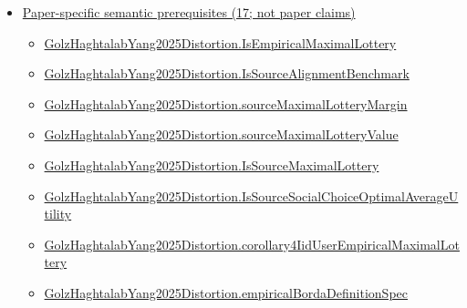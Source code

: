 \documentclass[10pt]{article}
\begin{document}
\begin{itemize}[leftmargin=1.2em]
\begin{itemize}[leftmargin=1.2em]
\item \hyperlink{library-prerequisite-268c959ee7d2d148}{Applied\allowbreak{}Modeling\allowbreak{}Lib.\allowbreak{}PMF\allowbreak{}Full\allowbreak{}Support}
\item \hyperlink{library-prerequisite-de8e2a8bfe221a38}{Applied\allowbreak{}Modeling\allowbreak{}Lib.\allowbreak{}pmf\allowbreak{}Prod}
\end{itemize}
\item \hyperlink{paper-prerequisite-section-5ef5ef0364b6939c}{Paper-specific semantic prerequisites (17; not paper claims)}
\begin{itemize}[leftmargin=1.2em]
\item \hyperlink{paper-prerequisite-53af1666fc341b0f}{Golz\allowbreak{}Haghtalab\allowbreak{}Yang2025\allowbreak{}Distortion.\allowbreak{}Is\allowbreak{}Empirical\allowbreak{}Maximal\allowbreak{}Lottery}
\item \hyperlink{paper-prerequisite-54fbc7c16362dbdd}{Golz\allowbreak{}Haghtalab\allowbreak{}Yang2025\allowbreak{}Distortion.\allowbreak{}Is\allowbreak{}Source\allowbreak{}Alignment\allowbreak{}Benchmark}
\item \hyperlink{paper-prerequisite-dbd778917da393ac}{Golz\allowbreak{}Haghtalab\allowbreak{}Yang2025\allowbreak{}Distortion.\allowbreak{}source\allowbreak{}Maximal\allowbreak{}Lottery\allowbreak{}Margin}
\item \hyperlink{paper-prerequisite-bbe7079711c4e442}{Golz\allowbreak{}Haghtalab\allowbreak{}Yang2025\allowbreak{}Distortion.\allowbreak{}source\allowbreak{}Maximal\allowbreak{}Lottery\allowbreak{}Value}
\item \hyperlink{paper-prerequisite-91b5f077c58b43c1}{Golz\allowbreak{}Haghtalab\allowbreak{}Yang2025\allowbreak{}Distortion.\allowbreak{}Is\allowbreak{}Source\allowbreak{}Maximal\allowbreak{}Lottery}
\item \hyperlink{paper-prerequisite-ceb3f23b84b56503}{Golz\allowbreak{}Haghtalab\allowbreak{}Yang2025\allowbreak{}Distortion.\allowbreak{}Is\allowbreak{}Source\allowbreak{}Social\allowbreak{}Choice\allowbreak{}Optimal\allowbreak{}Average\allowbreak{}Utility}
\item \hyperlink{paper-prerequisite-54cac251e94c8e83}{Golz\allowbreak{}Haghtalab\allowbreak{}Yang2025\allowbreak{}Distortion.\allowbreak{}corollary4\allowbreak{}Iid\allowbreak{}User\allowbreak{}Empirical\allowbreak{}Maximal\allowbreak{}Lottery}
\item \hyperlink{paper-prerequisite-674d1bc00409609f}{Golz\allowbreak{}Haghtalab\allowbreak{}Yang2025\allowbreak{}Distortion.\allowbreak{}empirical\allowbreak{}Borda\allowbreak{}Definition\allowbreak{}Spec}

\end{itemize}
\end{itemize}
\end{document}

